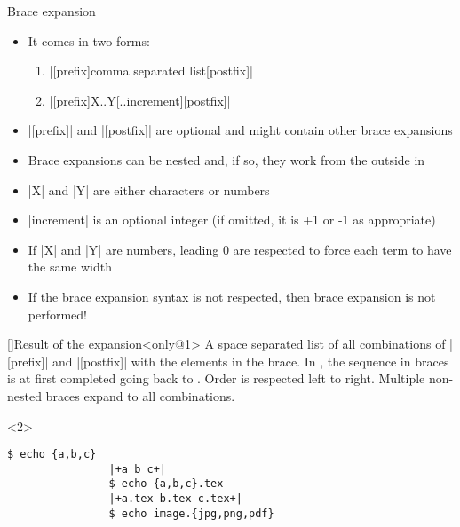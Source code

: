 \begin{frame}[fragile]{Brace expansion}
    \vspace{-3mm}
    \begin{overlayarea}{\textwidth}{0.7\textheight}
        \begin{itemize}
            \item It comes in two forms:
                \begin{enumerate}
                    \item \bash|[prefix]{comma separated list}[postfix]|
                    \item \bash|[prefix]{X..Y[..increment]}[postfix]|
                \end{enumerate}
            \item<only@1> \bash|[prefix]| and \bash|[postfix]| are optional and might contain other brace expansions
            \item<only@1> Brace expansions can be nested and, if so, they work from the outside in
            \item<only@1> \bash|X| and \bash|Y| are either characters or numbers
            \item<only@1> \bash|increment| is an optional integer (if omitted, it is +1 or -1 as appropriate)
            \item<only@1> If \bash|X| and \bash|Y| are numbers, leading 0 are respected to force each term to have the same width
            \item<only@1> If the brace expansion syntax is not respected, then brace expansion is not performed!
        \end{itemize}
        \begin{varblock}{}[\textwidth]{Result of the expansion}<only@1>
            A space separated list of all combinations of \bash|[prefix]| and \bash|[postfix]| with the elements in the brace.
            In , the sequence in braces is at first completed going back to .
            Order is respected left to right. Multiple non-nested braces expand to all combinations.
        \end{varblock}
        \begin{onlyenv}<2>
            \begin{lstlisting}[style=MyBash, style=oddnumbers, aboveskip=2mm]
                $ echo {a,b,c}
                |+a b c+|
                $ echo {a,b,c}.tex
                |+a.tex b.tex c.tex+|
                $ echo image.{jpg,png,pdf}

\end{lstlisting}
\end{onlyenv}
\end{overlayarea}
\end{frame}

